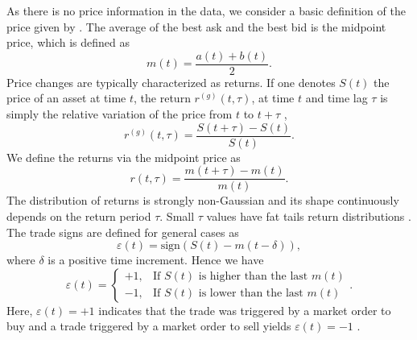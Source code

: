 As there is no price information in the data, we consider a basic definition of
the price given by \cite{patterns_forex,political_forex,forex_liquidity}. The
average of the best ask and the best bid is the midpoint price, which is
defined as
\cite{subtle_nature,Bouchaud_2004,teach_spread,large_prices_changes,my_paper_response_financial,em_stylized_facts,prop_order_book,stat_theory}
\begin{equation}
    m \left(t\right) = \frac{a\left(t\right) + b\left(t\right)}{2}.
\end{equation}
Price changes are typically characterized as returns. If one denotes
$S\left( t\right)$ the price of an asset at time $t$, the return
$r^{\left(g\right)}\left(t, \tau\right)$, at time $t$ and time lag $\tau$ is
simply the relative variation of the price from $t$ to $t + \tau$
\cite{subtle_nature,empirical_facts,asynchrony_effects_corr,tick_size_impact,causes_epps_effect,non_stationarity},
\begin{equation}\label{eq:return_general}
    r^{\left(g\right)} \left(t, \tau \right) = \frac{S\left(t + \tau\right)
    - S\left(t\right)}{S\left(t\right)}.
\end{equation}
We define the returns via the midpoint price as
\begin{equation}\label{eq:midpoint_price_return}
    r\left(t,\tau\right) = \frac{m\left(t+\tau\right)-m\left(t\right)}
    {m\left(t\right)}.
\end{equation}
The distribution of returns is strongly non-Gaussian and its shape continuously
depends on the return period $\tau$. Small $\tau$ values have fat tails return
distributions \cite{subtle_nature}. The trade signs are defined for general
cases as
\begin{equation}\label{eq:trade_sign_general}
    \varepsilon\left(t\right)=\text{sign}\left(S\left(t\right)
    -m\left(t-\delta\right)\right),
\end{equation}
where $\delta$ is a positive time increment. Hence we have
\begin{equation}\label{eq:trade_sign_results}
    \varepsilon\left(t\right)=\left\{
    \begin{array}{cc}
    +1, & \text{If } S\left(t\right)
    \text{ is higher than the last } m\left( t \right)\\
    -1, & \text{If } S\left(t\right)
    \text{ is lower than the last } m\left( t \right)
    \end{array}\right. .
\end{equation}
Here, $\varepsilon(t) = +1$ indicates that the trade was triggered by a market
order to buy and a trade triggered by a market order to sell yields
$\varepsilon(t) = -1$
\cite{subtle_nature,Bouchaud_2004,spread_changes_affect,quant_stock_price_response,order_flow_persistent}.


